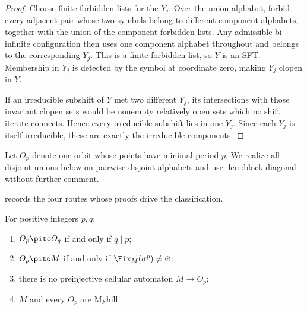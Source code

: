 \begin{proof}
Choose finite forbidden lists for the $Y_j$.  Over the union alphabet, forbid
every adjacent pair whose two symbols belong to different component
alphabets, together with the union of the component forbidden lists.  Any
admissible bi-infinite configuration then uses one component alphabet
throughout and belongs to the corresponding $Y_j$.  This is a finite
forbidden list, so $Y$ is an SFT.  Membership in $Y_j$ is detected by the
symbol at coordinate zero, making $Y_j$ clopen in $Y$.

If an irreducible subshift of $Y$ met two different $Y_j$, its intersections
with those invariant clopen sets would be nonempty relatively open sets which
no shift iterate connects.  Hence every irreducible subshift lies in one
$Y_j$.  Since each $Y_j$ is itself irreducible, these are exactly the
irreducible components.
\end{proof}

Let $O_p$ denote one orbit whose points have minimal period $p$.  We realize
all disjoint unions below on pairwise disjoint alphabets and use
\cref{lem:block-diagonal} without further comment.

 records the four routes whose proofs drive the classification.


\begin{lemma}
\label{lem:periodic-routes}
For positive integers $p,q$:
\begin{enumerate}[label=(\roman*)]
  \item $O_p\pito O_q$ if and only if $q\mid p$;
  \item $O_p\pito M$ if and only if
  $\Fix_M(\sigma^p)\ne\varnothing$;
  \item there is no preinjective cellular automaton $M\to O_p$;
  \item $M$ and every $O_p$ are Myhill.
\end{enumerate}
\end{lemma}

